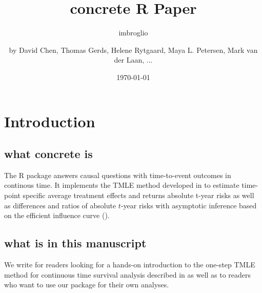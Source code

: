 \documentclass{report}
\author{imbroglio}
\date{\today}
\title{}
\newcommand{\1}{\ensuremath{\mathbf{1}}}
\begin{document}
\title{concrete R Paper}
\subtitle{}
\author{by David Chen, Thomas Gerds, Helene Rytgaard, Maya L. Petersen, Mark van der Laan, ...}

\maketitle


\section{Introduction}
\label{intro}
\subsection{what concrete is}
\label{sec:org9fc20ac}

The R package  answers causal questions with time-to-event outcomes in continous time. It implements the TMLE method developed in \cite{rytgaard_one-step_2021} to estimate time-point specific average treatment effects and returns absolute t-year risks as well as differences and ratios of absolute \(t\)-year risks with asymptotic inference based on the efficient influence curve (\cite{laan_unified_2003-1}).

\subsection{what is in this manuscript}
\label{sec:org17ad40f}

We write for readers looking for a hands-on introduction to the one-step TMLE method for
continuous time survival analysis described in \cite{rytgaard_one-step_2021} as well as to readers
who want to use our package for their own analyses.
\end{document}
